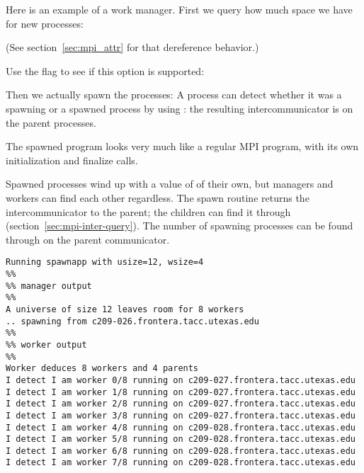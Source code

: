 Here is an example of a work manager.
%
First we query how much space we have for new processes:
%

(See section~\ref{sec:mpi_attr} for that dereference behavior.)

Use the flag to see if this option is supported:

Then we actually spawn the processes:
%
%
%
A process can detect whether it was a spawning or a spawned process
by using :
the resulting intercommunicator is 
on the parent processes.

The spawned program looks very much like a regular MPI program, with
its own initialization and finalize calls.

%

Spawned processes wind up with a value of  of their
own, but managers and workers can find each other regardless.
The spawn routine returns the intercommunicator to the parent; the children
can find it through  (section~\ref{sec:mpi-inter-query}).
The number of spawning processes can be found through
 on the parent communicator.

\begin{verbatim}
Running spawnapp with usize=12, wsize=4
%%
%% manager output
%%
A universe of size 12 leaves room for 8 workers
.. spawning from c209-026.frontera.tacc.utexas.edu
%%
%% worker output
%%
Worker deduces 8 workers and 4 parents
I detect I am worker 0/8 running on c209-027.frontera.tacc.utexas.edu
I detect I am worker 1/8 running on c209-027.frontera.tacc.utexas.edu
I detect I am worker 2/8 running on c209-027.frontera.tacc.utexas.edu
I detect I am worker 3/8 running on c209-027.frontera.tacc.utexas.edu
I detect I am worker 4/8 running on c209-028.frontera.tacc.utexas.edu
I detect I am worker 5/8 running on c209-028.frontera.tacc.utexas.edu
I detect I am worker 6/8 running on c209-028.frontera.tacc.utexas.edu
I detect I am worker 7/8 running on c209-028.frontera.tacc.utexas.edu
\end{verbatim}

